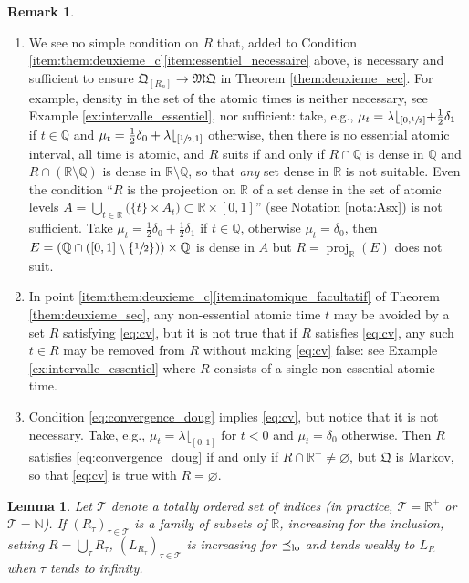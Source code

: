 \documentclass[JEP,XML,SOM,Unicode,NoEqCountersInSection,NoFloatCountersInSection,published]{cedram}
\theoremstyle{plain}
\newtheorem{lem}[them]{Lemma}
\theoremstyle{definition}
\newtheorem{rem}[them]{Remark}
\newcommand{\como}{\mathfrak{Q}}
\newcommand{\mq}{\mathfrak{MQ}}
\newcommand{\Tt}{{\mathcal T}}
\newcommand{\la}{\lambda}
\newcommand{\R}{\mathbb{R}}
\newcommand{\Q}{\mathbb{Q}}
\newcommand{\N}{\mathbb{N}}
\newcommand{\pr}{\operatorname{proj}}
\newcommand{\leqlc}{\preceq_{\rm lo}}
\begin{document}
\skpt
\begin{rem}
\begin{enumerate}
\item
We see no simple condition on $R$ that, added to Condition \eqref{item:them:deuxieme_c}\eqref{item:essentiel_necessaire} above, is necessary and sufficient to ensure $\como_{[R_n]}\to\mq$ in Theorem \ref{them:deuxieme_sec}. For example, density in the set of the atomic times is neither necessary, see Example \ref{ex:intervalle_essentiel}, nor sufficient: take, e.g., $\mu_t=\la\lfloor_{[0,\sfrac12]}+\frac12\delta_1$ if $t\in\Q$ and $\mu_t=\frac12\delta_0+\la\lfloor_{[\sfrac12,1]}$ otherwise, then there is no essential atomic interval, all time is atomic, and $R$ suits if and only if $R\cap\Q$ is dense in $\Q$ and $R\cap(\R\setminus\Q)$ is dense in $\R\setminus\Q$, so that \emph{any}\/ set dense in $\R$ is not suitable. Even the condition ``$R$ is the projection on $\R$ of a set dense in the set of atomic levels $A=\bigcup_{t\in\R}\big(\{t\}\times A_t\bigr)\subset\R\times [0,1]$'' (see Notation \ref{nota:Asx}) is not sufficient. Take $\mu_t=\frac12\delta_0+\frac12\delta_1$ if $t\in\Q$, otherwise $\mu_t=\delta_0$, then $E=(\Q\cap([0,1]\setminus\{\sfrac12\}))\times\Q$ is dense in $A$ but $R=\pr_{\R}(E)$ does not suit.

\item
In point \eqref{item:them:deuxieme_c}\eqref{item:inatomique_facultatif} of Theorem \ref{them:deuxieme_sec}, any non-essential atomic time $t$ may be avoided by a set $R$ satisfying \eqref{eq:cv}, but it is not true that if $R$ satisfies \eqref{eq:cv}, any such $t\in R$ may be removed from $R$ without making \eqref{eq:cv} false: see Example \ref{ex:intervalle_essentiel} where $R$ consists of a single non-essential atomic time.

\item
Condition \eqref{eq:convergence_doug} implies \eqref{eq:cv}, but notice that it is not necessary. Take, e.g., $\mu_t=\la\lfloor_{[0,1]}$ for $t<0$ and $\mu_t=\delta_0$ otherwise. Then $R$ satisfies \eqref{eq:convergence_doug} if and only if $R\cap \R^+\neq\varnothing$, but $\como$ is Markov, so that \eqref{eq:cv} is true with $R=\varnothing$.
\end{enumerate}
\end{rem}

\begin{lem}\label{lem:croissance_lc} Let $\Tt$ denote a totally ordered set of indices (in practice, $\Tt=\R^+$ or $\Tt=\N$). If $(R_\tau)_{\tau\in \Tt}$ is a family of subsets of\/ $\R$, increasing for the inclusion, setting $R=\bigcup_\tau R_\tau$, $(L_{R_\tau})_{\tau\in\Tt}$ is increasing for $\leqlc$ and tends weakly to $L_{R}$ when $\tau$ tends to infinity.
\end{lem}
\end{document}
